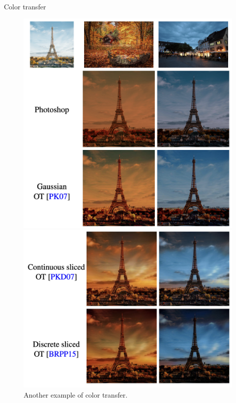 \begin{frame}{Color transfer}
    \footnotesize
    \begin{figure}
        \centering
        \captionsetup{font=scriptsize}
        \begin{minipage}[b]{0.45\linewidth}
            \vspace{0pt}
            \centering
            \includegraphics[width=\textwidth]{png/tower-ctrans.png}
        \end{minipage}
        \hfill
        \begin{minipage}[b]{0.45\linewidth}
            \vspace{0pt}
            \centering
            \includegraphics[width=\textwidth]{png/tower-ctrans2.png}
        \end{minipage}
        \caption{Another example of color transfer.}
    \end{figure}
\end{frame}

